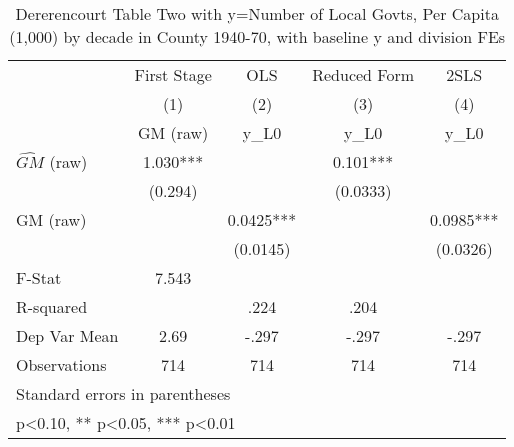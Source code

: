 \begin{table}[htbp]\centering
\def\sym#1{\ifmmode^{#1}\else\(^{#1}\)\fi}
\caption{Dererencourt Table Two with y=Number of Local Govts, Per Capita (1,000) by decade in County 1940-70, with baseline y and division FEs}
\begin{tabular}{l*{4}{c}}
\toprule
                    & First Stage   &         OLS   &Reduced Form   &        2SLS   \\
                    &\multicolumn{1}{c}{(1)}&\multicolumn{1}{c}{(2)}&\multicolumn{1}{c}{(3)}&\multicolumn{1}{c}{(4)}\\
                    &\multicolumn{1}{c}{GM  (raw)}&\multicolumn{1}{c}{y\_L0}&\multicolumn{1}{c}{y\_L0}&\multicolumn{1}{c}{y\_L0}\\
\midrule
$\hat{GM}$ (raw)    &       1.030***&               &       0.101***&               \\
                    &     (0.294)   &               &    (0.0333)   &               \\
\addlinespace
GM  (raw)           &               &      0.0425***&               &      0.0985***\\
                    &               &    (0.0145)   &               &    (0.0326)   \\
\midrule
F-Stat              &       7.543   &               &               &               \\
R-squared           &               &        .224   &        .204   &               \\
Dep Var Mean        &        2.69   &       -.297   &       -.297   &       -.297   \\
Observations        &         714   &         714   &         714   &         714   \\
\bottomrule
\multicolumn{5}{l}{\footnotesize Standard errors in parentheses}\\
\multicolumn{5}{l}{\footnotesize * p<0.10, ** p<0.05, *** p<0.01}\\
\end{tabular}
\end{table}
